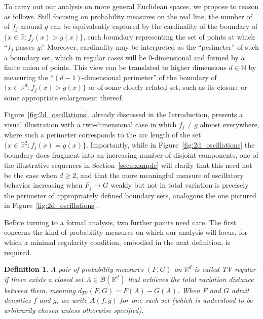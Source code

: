 \documentclass[12pt]{article}
\newtheorem{definition}{Definition}
\newcommand{\RR}{\mathbb{R}}
\newcommand{\NN}{\mathbb{N}}
\begin{document}
To carry out our analysis on more general Euclidean spaces, we propose to reason as follows. Still
focusing on probability measures on the real line, the number of of $f_j$ around $g$ can be
equivalently captured by the cardinality of the boundary of
$\{x\in\RR : f_j(x)>g(x)\}$, such boundary representing the set of points at which ``$f_j$ passes
$g$.'' Moreover, cardinality may be interpreted as the ``perimeter'' of such a
boundary set, which in regular cases will be $0$-dimensional and formed by a finite union of points. This view
can be translated to higher dimensions $d\in\NN$ by measuring the ``$(d-1)$-dimensional
perimeter'' of the boundary of $\{x\in\RR^d : f_j(x)>g(x)\}$ or of some closely related set, such as its closure or some appropriate enlargement thereof. 



Figure~\ref{fig:2d_oscillations}, already discussed in the Introduction, presents a visual illustration with a two-dimensional case in which $f_j\neq g$ almost everywhere, where such a perimeter corresponds
to the arc length of the set $\{x\in\mathbb R^2 : f_j(x)=g(x)\}$. Importantly, while in Figure~\ref{fig:2d_oscillations} the boundary does fragment into an increasing number of disjoint components, one of the illustrative sequences in Section~\ref{sec:example} will clarify that this need not be the case when $d\geq 2$, and that the more meaningful measure of oscillatory behavior increasing when $F_j\to G$ weakly but not in total variation is precisely the perimeter of appropriately defined boundary sets, analogous the one pictured in Figure~\ref{fig:2d_oscillations}.



Before turning to a formal analysis, two further points need care. The first concerns the kind of probability measures on which our analysis will focus, for which a minimal regularity condition, embodied in the next definition, is required.

\begin{definition}\label{def:tv_regular}
A pair of probability measures $(F, G)$ on $\RR^d$ is called \emph{TV-regular} if there
exists a closed set $A \in \mathcal B(\RR^d)$ that achieves the total variation distance between
them, meaning $d_{TV}(F, G) = F(A) - G(A)$. When $F$ and $G$ admit densities $f$ and $g$, we write
$A(f,g)$ for one such set (which is understood to be arbitrarily chosen unless otherwise specified).
\end{definition}
\end{document}
